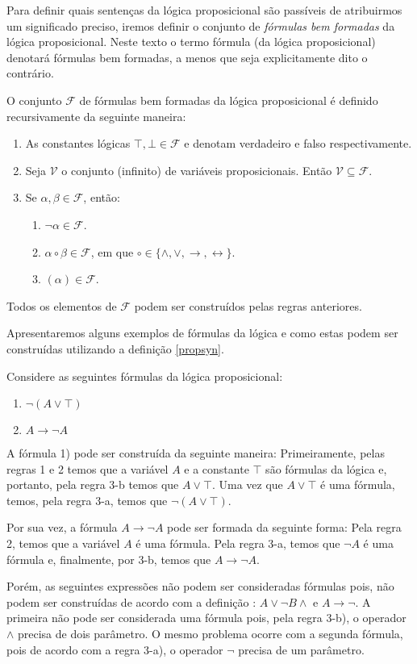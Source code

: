 Para definir quais senten\c{c}as da l\'ogica proposicional s\~ao pass\'iveis de atribuirmos um significado preciso, iremos definir o conjunto
de \textit{f\'ormulas bem formadas} da l\'ogica proposicional. Neste texto o termo f\'ormula (da l\'ogica proposicional) denotar\'a f\'ormulas
bem formadas, a menos que seja explicitamente dito o contr\'ario.

\begin{Definition}\label{propsyn}
O conjunto $\mathcal{F}$ de f\'ormulas bem formadas da l\'ogica proposicional \'e definido recursivamente da seguinte maneira:
\begin{enumerate}
  \item As constantes l\'ogicas $\top,\bot \in \mathcal{F}$ e denotam verdadeiro e falso respectivamente. 
  \item Seja $\mathcal{V}$ o conjunto (infinito) de vari\'aveis proposicionais. Ent\~ao $\mathcal{V} \subseteq \mathcal{F}$.
  \item Se $\alpha,\beta \in \mathcal{F}$, ent\~ao:
  \begin{enumerate}
    \item $\neg \alpha \in \mathcal{F}$.
    \item $\alpha \circ \beta \in \mathcal{F}$, em que $\circ \in \{\land,\lor,\to,\leftrightarrow\}$.
    \item $(\alpha)\in\mathcal{F}$.
  \end{enumerate}
\end{enumerate}
Todos os elementos de $\mathcal{F}$ podem ser constru\'idos pelas regras anteriores.
\end{Definition}
Apresentaremos alguns exemplos de f\'ormulas da l\'ogica e como estas
podem ser constru\'idas utilizando a defini\c{c}\~ao \ref{propsyn}.
\begin{Example}
Considere as seguintes fórmulas da lógica proposicional:
\begin{enumerate}
  \item $\neg (A \lor \top)$
  \item $A \to \neg A$
\end{enumerate}
A f\'ormula 1) pode ser constru\'ida da seguinte maneira:
Primeiramente, pelas regras 1 e 2 temos que a vari\'avel $A$ e a
constante $\top$ s\~ao f\'ormulas da lógica e, portanto, pela regra
3-b temos que $A \lor \top$. Uma vez que $A \lor \top$ \'e uma
f\'ormula, temos, pela regra 3-a, temos que $\neg (A \lor \top)$.

Por sua vez, a f\'ormula $A \to \neg A$ pode ser formada da seguinte
forma: Pela regra 2, temos que a vari\'avel $A$ \'e uma
f\'ormula. Pela regra 3-a, temos que $\neg A$ \'e uma f\'ormula e,
finalmente, por 3-b, temos que $A \to \neg A$.

Por\'em, as seguintes express\~oes n\~ao podem ser consideradas
f\'ormulas pois, n\~ao podem ser constru\'idas de acordo com a
defini\c{c}\~ao \label{propsyn}: $A \lor \neg B \land$ e $A \to
\neg$. A primeira n\~ao pode ser considerada uma f\'ormula pois,
pela regra 3-b), o operador $\land$ precisa de dois par\^ametro. O
mesmo problema ocorre com a segunda f\'ormula, pois de acordo com
a regra 3-a), o operador $\neg$ precisa de um par\^ametro.
\end{Example}

